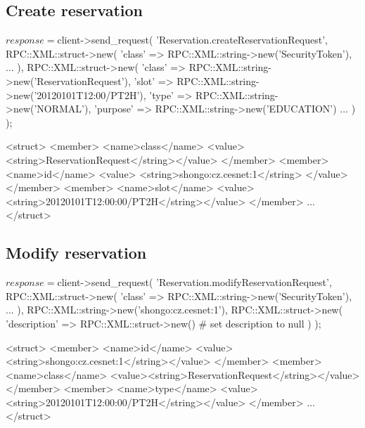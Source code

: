 \documentclass[a4paper]{report}
\begin{document}
\newpage
\subsection{Create reservation}
\begin{PerlCmd}
$response = $client->send_request(
    'Reservation.createReservationRequest',
    RPC::XML::struct->new(
        'class' => RPC::XML::string->new('SecurityToken'),
        ...
    ),
    RPC::XML::struct->new(
        'class' => RPC::XML::string->new('ReservationRequest'),
        'slot' => RPC::XML::string->new('20120101T12:00/PT2H'),
        'type' => RPC::XML::string->new('NORMAL'),
        'purpose' => RPC::XML::string->new('EDUCATION')
        ...
    )
);
\end{PerlCmd}
\begin{PerlResponse}
<struct>
  <member>
    <name>class</name>
    <value><string>ReservationRequest</string></value>
  </member>
  <member>
    <name>id</name>
    <value>
      <string>shongo:cz.cesnet:1</string>
    </value>
  </member>
  <member>
    <name>slot</name>
    <value><string>20120101T12:00:00/PT2H</string></value>
  </member>
  ...
</struct>
\end{PerlResponse}

\newpage
\subsection{Modify reservation}
\begin{PerlCmd}
$response = $client->send_request(
    'Reservation.modifyReservationRequest',
    RPC::XML::struct->new(
        'class' => RPC::XML::string->new('SecurityToken'),
        ...
    ),
    RPC::XML::string->new('shongo:cz.cesnet:1'),
    RPC::XML::struct->new(
        'description' => RPC::XML::struct->new() # set description to null
    )
);
\end{PerlCmd}
\begin{PerlResponse}
<struct>
  <member>
    <name>id</name>
    <value><string>shongo:cz.cesnet:1</string></value>
  </member>
  <member>
    <name>class</name>
    <value><string>ReservationRequest</string></value>
  </member>
  <member>
    <name>type</name>
    <value><string>20120101T12:00:00/PT2H</string></value>    
  </member>
  ...
</struct>
\end{PerlResponse}

\newpage
\end{document}
